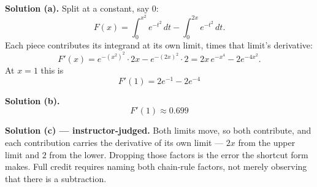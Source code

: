 \documentclass[12pt]{article}
\begin{document}

\textbf{Solution (a).} Split at a constant, say $0$:
\[ F(x) = \int_0^{x^2} e^{-t^2}\,dt - \int_0^{2x} e^{-t^2}\,dt . \]
Each piece contributes its integrand at its own limit, times that limit's
derivative:
\[ F'(x) = e^{-(x^2)^2}\cdot 2x - e^{-(2x)^2}\cdot 2 = 2x\,e^{-x^4} - 2e^{-4x^2}. \]
At $x = 1$ this is
\[ \boxed{F'(1) = 2e^{-1} - 2e^{-4}} \]

\textbf{Solution (b).}
\[ \boxed{F'(1) \approx 0.699} \]

\textbf{Solution (c) --- instructor-judged.} Both limits move, so both
contribute, and each contribution carries the derivative of its own limit ---
$2x$ from the upper limit and $2$ from the lower. Dropping those factors is the
error the shortcut form makes. Full credit requires naming both chain-rule
factors, not merely observing that there is a subtraction.
\end{document}
